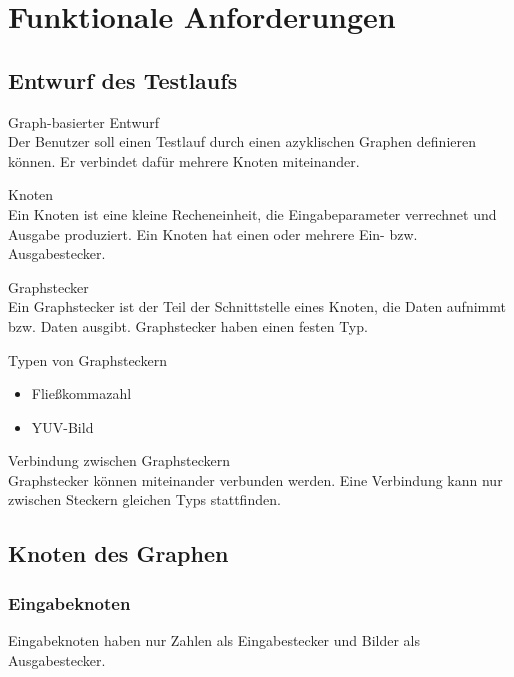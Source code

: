 \section{Funktionale Anforderungen}

\subsection{Entwurf des Testlaufs}

\begin{speclist}[F]
\setcounter{specnum}{11010}

\spec Graph-basierter Entwurf \\
Der Benutzer soll einen Testlauf durch einen azyklischen Graphen definieren können. Er verbindet dafür mehrere Knoten miteinander.

\spec Knoten \\
Ein Knoten ist eine kleine Recheneinheit, die Eingabeparameter verrechnet und Ausgabe produziert. Ein Knoten hat einen oder mehrere Ein- bzw. Ausgabestecker.

\spec Graphstecker \\
Ein Graphstecker ist der Teil der Schnittstelle eines Knoten, die Daten aufnimmt bzw. Daten ausgibt. Graphstecker haben einen festen Typ.

\spec Typen von Graphsteckern
\begin{itemize}
	\item Fließkommazahl
	\item YUV-Bild
\end{itemize}

\spec Verbindung zwischen Graphsteckern \\
Graphstecker können miteinander verbunden werden. Eine Verbindung kann nur zwischen Steckern gleichen Typs stattfinden.

\end{speclist}

\subsection{Knoten des Graphen}

\subsubsection{Eingabeknoten}
Eingabeknoten haben nur Zahlen als Eingabestecker und Bilder als Ausgabestecker.

